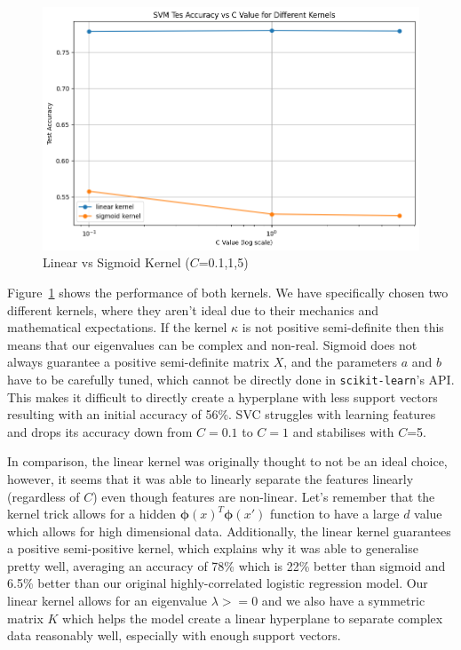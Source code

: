 \documentclass[10pt,twocolumn]{article}
\begin{document}
\begin{figure}[H]
    \centering
    \includegraphics[width=1\linewidth]{images/svm/svm-linear-vs-kernel-and-regularisation.png}
    \caption{Linear vs Sigmoid Kernel ($C$=0.1,1,5)}
    \label{fig:svm-kernels}
\end{figure}
Figure~\ref{fig:svm-kernels} shows the performance of both kernels. We have specifically chosen two different kernels, where they aren't ideal due to their mechanics and mathematical expectations. If the kernel $\kappa$ is not positive semi-definite then this means that our eigenvalues can be complex and non-real. Sigmoid does not always guarantee a positive semi-definite matrix $X$, and the parameters $a$ and $b$ have to be carefully tuned, which cannot be directly done in \texttt{scikit-learn}'s API. This makes it difficult to directly create a hyperplane with less support vectors resulting with an initial accuracy of 56\%. SVC struggles with learning features and drops its accuracy down from $C=0.1$ to $C=1$ and stabilises with $C$=5.

In comparison, the linear kernel was originally thought to not be an ideal choice, however, it seems that it was able to linearly separate the features linearly (regardless of $C$) even though features are non-linear. Let's remember that the kernel trick allows for a hidden $\mathbf{\phi}(x)^T \mathbf{\phi}(x')$ function to have a large $d$ value which allows for high dimensional data. Additionally, the linear kernel guarantees a positive semi-positive kernel, which explains why it was able to generalise pretty well, averaging an accuracy of 78\% which is 22\% better than sigmoid and 6.5\% better than our original highly-correlated logistic regression model. Our linear kernel allows for an eigenvalue $\lambda >= 0$ and we also have a symmetric matrix $K$ which helps the model create a linear hyperplane to separate complex data reasonably well, especially with enough support vectors.
\end{document}
